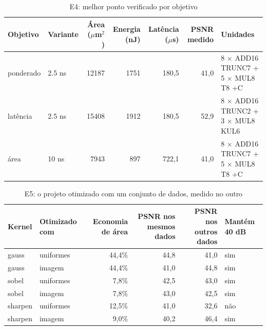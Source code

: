 \begin{table}[htbp]
\centering
\caption{E4: melhor ponto verificado por objetivo}
\begin{tabular}{|l|l|r|r|r|r|l|}
\hline
\rowcolor{tabAzul}\color{white}Objetivo & \color{white}Variante & \color{white}Área ($\mu$m$^2$) & \color{white}Energia (nJ) & \color{white}Latência ($\mu$s) & \color{white}PSNR medido & \color{white}Unidades \\
\hline
ponderado & 2.5 ns & 12187 & 1751 & 180,5 & 41,0 & 8 $\times$ ADD16 TRUNC7 + 5 $\times$ MUL8 T8 +C \\ \hline
latência & 2.5 ns & 15408 & 1912 & 180,5 & 52,9 & 8 $\times$ ADD16 TRUNC2 + 3 $\times$ MUL8 KUL6 \\ \hline
área & 10 ns & 7943 & 897 & 722,1 & 41,0 & 8 $\times$ ADD16 TRUNC7 + 5 $\times$ MUL8 T8 +C \\ \hline
\end{tabular}
\end{table}

\begin{table}[htbp]
\centering
\caption{E5: o projeto otimizado com um conjunto de dados, medido no outro}
\begin{tabular}{|l|l|r|r|r|l|}
\hline
\rowcolor{tabAzul}\color{white}Kernel & \color{white}Otimizado com & \color{white}Economia de área & \color{white}PSNR nos mesmos dados & \color{white}PSNR nos outros dados & \color{white}Mantém 40 dB \\
\hline
gauss & uniformes & 44,4\% & 44,8 & 41,0 & sim \\ \hline
gauss & imagem & 44,4\% & 41,0 & 44,8 & sim \\ \hline
sobel & uniformes & 7,8\% & 42,5 & 43,0 & sim \\ \hline
sobel & imagem & 7,8\% & 43,0 & 42,5 & sim \\ \hline
sharpen & uniformes & 12,5\% & 41,0 & 32,6 & não \\ \hline
sharpen & imagem & 9,0\% & 40,2 & 46,4 & sim \\ \hline
\end{tabular}
\end{table}

